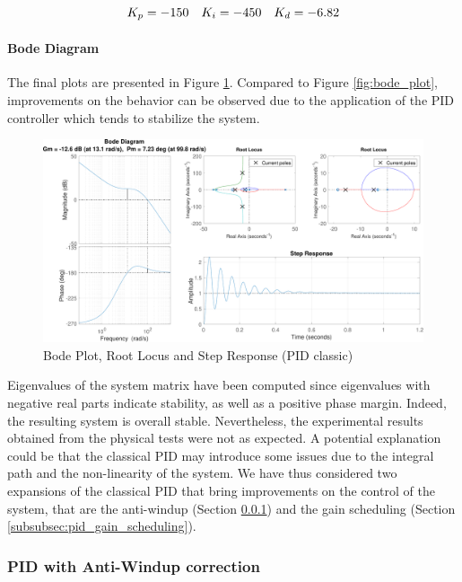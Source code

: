 \begin{equation}
    \centering
    K_p = -150 \quad K_i = -450 \quad K_d = -6.82
\end{equation}

\paragraph{Bode Diagram}

The final plots are presented in Figure \ref{fig:pid_classical_bode}.
Compared to Figure \ref{fig:bode_plot}, improvements on the behavior can be observed due to the application of the PID controller which tends to stabilize the system.

\begin{figure}[H]
    \centering
    \includegraphics[width=1\linewidth]{./img/MATLAB/controllers/PID_classical.pdf}
    \caption{Bode Plot, Root Locus and Step Response (PID classic)}
    \label{fig:pid_classical_bode}
\end{figure}

Eigenvalues of the system matrix have been computed since eigenvalues with negative real parts indicate stability, as well as a positive phase margin.
Indeed, the resulting system is overall stable.
Nevertheless, the experimental results obtained from the physical tests were not as expected.
A potential explanation could be that the classical PID may introduce some issues due to the integral path and the non-linearity of the system.
We have thus considered two expansions of the classical PID that bring improvements on the control of the system, that are the anti-windup (Section \ref{subsubsec:pid_anti_windup}) and the gain scheduling (Section \ref{subsubsec:pid_gain_scheduling}).



\subsubsection{PID with Anti-Windup correction}
\label{subsubsec:pid_anti_windup}

